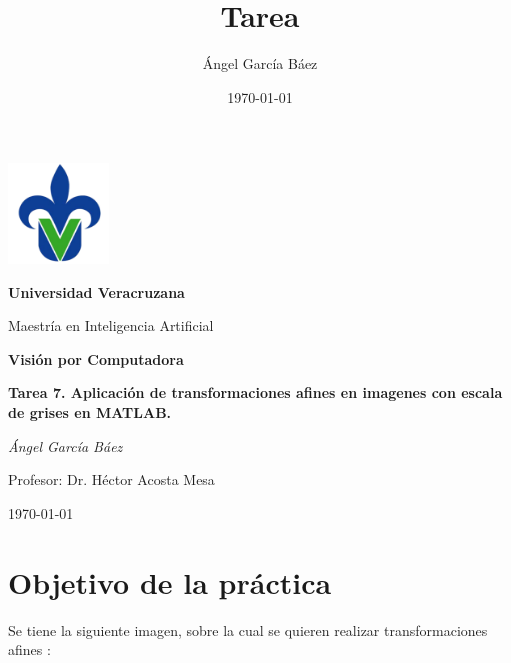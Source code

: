 \documentclass[11pt, letterpaper]{article}
\title{\bfseries Tarea}
\author{Ángel García Báez}
\date{\today}
\begin{document}
	
	\begin{titlepage}
		\centering
		\includegraphics[width=0.2\textwidth]{logo.png}\par
		\vspace{1cm}
		{\LARGE \bfseries Universidad Veracruzana \par}
		\vspace{1cm}
		{\Large Maestría en Inteligencia Artificial\par}
		\vspace{3cm}
		{\LARGE \bfseries Visión por Computadora \par}
		\vspace{1cm}
		{\Large \bfseries Tarea 7. Aplicación de transformaciones afines en imagenes con escala de grises en MATLAB. \par}
		\vfill
		{\Large \textit{Ángel García Báez}\par}
		\vspace{1cm}
		{\Large Profesor: Dr. Héctor Acosta Mesa\par}
		\vfill
		{\Large \today \par}
	\end{titlepage}
	
	\newpage
	\tableofcontents
	\newpage
	
\section{Objetivo de la práctica}

Se tiene la siguiente imagen, sobre la cual se quieren realizar transformaciones afines :
\end{document}
